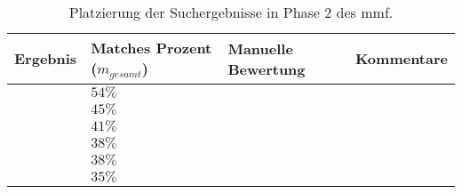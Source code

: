 \begin{table}[!h]
  \centering
  \begin{tabular}{m{2cm} m{4.3cm} m{4.3cm} m{2.5cm}}
    \toprule
    \textbf{Ergebnis} & \textbf{Matches Prozent ($m_{gesamt}$)} & \textbf{Manuelle Bewertung} & \textbf{Kommentare} \\ \midrule
    \cite{arh-result-no-filter-1} & $54\%$ & & \\ \hline
    \cite{arh-result-no-filter-3} & $45\%$& & \\ \hline
    \cite{arh-result-no-filter-2} & $41\%$& & \\ \hline
    \cite{arh-result-no-filter-4} & $38\%$& & \\ \hline
    \cite{arh-result-no-filter-5} & $38\%$& & \\ \hline
    \cite{arh-result-important-filter-4} & $35\%$& & \\
    \bottomrule
  \end{tabular}
  \caption[Platzierung der Suchergebnisse in Phase 2 des \gls{mmf}]{
   	Platzierung der Suchergebnisse in Phase 2 des \gls{mmf}.
  }
  \label{tab:phase2-ranking}
\end{table}
